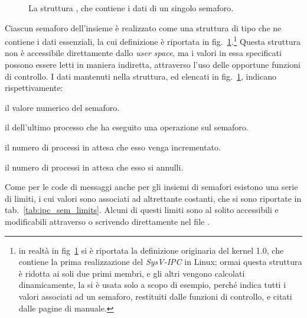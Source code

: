 \begin{figure}[!htb]
  \footnotesize \centering
  \begin{minipage}[c]{.85\textwidth}
  \end{minipage} 
  \normalsize 
  \caption{La struttura , che contiene i dati di un singolo
    semaforo.} 
  \label{fig:ipc_sem}
\end{figure}

Ciascun semaforo dell'insieme è realizzato come una struttura di tipo
 che ne contiene i dati essenziali, la cui definizione è riportata
in fig.~\ref{fig:ipc_sem}.\footnote{in realtà in fig~\ref{fig:ipc_sem} si è
  riportata la definizione originaria del kernel 1.0, che contiene la prima
  realizzazione del \textit{SysV-IPC} in Linux; ormai questa struttura è
  ridotta ai soli due primi membri, e gli altri vengono calcolati
  dinamicamente, la si è usata solo a scopo di esempio, perché indica tutti i
  valori associati ad un semaforo, restituiti dalle funzioni di controllo, e
  citati dalle pagine di manuale.}  Questa struttura non è accessibile
direttamente dallo \textit{user space}, ma i valori in essa specificati
possono essere letti in maniera indiretta, attraverso l'uso delle opportune
funzioni di controllo.  I dati mantenuti nella struttura, ed elencati in
fig.~\ref{fig:ipc_sem}, indicano rispettivamente:
\begin{basedescript}{\desclabelwidth{2cm}\desclabelstyle{\nextlinelabel}}
\item[\var{semval}] il valore numerico del semaforo.
\item[\var{sempid}] il  dell'ultimo processo che ha eseguito una
  operazione sul semaforo.
\item[\var{semncnt}] il numero di processi in attesa che esso venga
  incrementato.
\item[\var{semzcnt}] il numero di processi in attesa che esso si annulli.
\end{basedescript}

Come per le code di messaggi anche per gli insiemi di semafori esistono una
serie di limiti, i cui valori sono associati ad altrettante costanti, che si
sono riportate in tab.~\ref{tab:ipc_sem_limits}. Alcuni di questi limiti sono
al solito accessibili e modificabili attraverso  o scrivendo
direttamente nel file .

